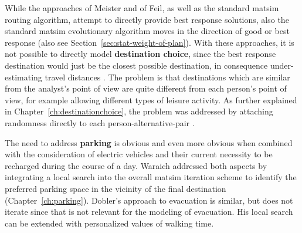 While the approaches of Meister and of Feil, as well as the standard \gls{matsim} routing algorithm, attempt to directly provide best response solutions, also the standard \gls{matsim} evolutionary algorithm moves in the direction of good or best response (also see Section~\ref{sec:stat-weight-of-plan}).  With these approaches, it is not possible to directly model \textbf{destination choice}, since the best response destination would just be the closest possible destination, in consequence under-estimating travel distances \citep{HorniEtAl_TRR_2009}.  The problem is that destinations which are similar from the analyst's point of view are quite different from each person's point of view, for example allowing different types of leisure activity.  As further explained in Chapter~\ref{ch:destinationchoice}, the problem was addressed by attaching randomness directly to each person-alternative-pair \citep[also see][]{HorniEtAl_TRB_2012}.



%

The need to address \textbf{parking} is obvious and even more obvious when combined with the consideration of electric vehicles and their current necessity to be recharged during the course of a day. 
Waraich addressed both aspects by 
integrating a local search into the overall \gls{matsim} iteration scheme to identify the preferred parking space in the vicinity of the final destination (Chapter~\ref{ch:parking}). 
Dobler's approach \citep[][]{Dobler_PhDThesis_2013} to evacuation is similar, but 
does not iterate since that is not relevant for the modeling of evacuation.
His local search can be extended with personalized values of walking time.

